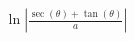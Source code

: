 \documentclass[preview]{standalone}
\begin{document}
\begin{align*}
\ln|\frac{\sec(\theta)+\tan(\theta)}{a}|
\end{align*}
\end{document}
